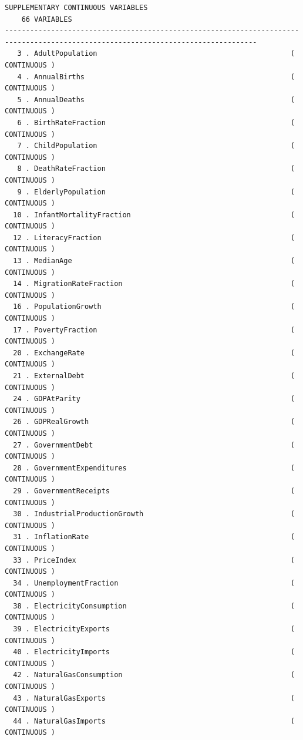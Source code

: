 \documentclass[a4paper,10pt,twocolumn]{article}
\begin{document}
\begin{landscape}
\begin{verbatim}
SUPPLEMENTARY CONTINUOUS VARIABLES
    66 VARIABLES
----------------------------------------------------------------------------------------------------------------------------------
   3 . AdultPopulation                                              ( CONTINUOUS )
   4 . AnnualBirths                                                 ( CONTINUOUS )
   5 . AnnualDeaths                                                 ( CONTINUOUS )
   6 . BirthRateFraction                                            ( CONTINUOUS )
   7 . ChildPopulation                                              ( CONTINUOUS )
   8 . DeathRateFraction                                            ( CONTINUOUS )
   9 . ElderlyPopulation                                            ( CONTINUOUS )
  10 . InfantMortalityFraction                                      ( CONTINUOUS )
  12 . LiteracyFraction                                             ( CONTINUOUS )
  13 . MedianAge                                                    ( CONTINUOUS )
  14 . MigrationRateFraction                                        ( CONTINUOUS )
  16 . PopulationGrowth                                             ( CONTINUOUS )
  17 . PovertyFraction                                              ( CONTINUOUS )
  20 . ExchangeRate                                                 ( CONTINUOUS )
  21 . ExternalDebt                                                 ( CONTINUOUS )
  24 . GDPAtParity                                                  ( CONTINUOUS )
  26 . GDPRealGrowth                                                ( CONTINUOUS )
  27 . GovernmentDebt                                               ( CONTINUOUS )
  28 . GovernmentExpenditures                                       ( CONTINUOUS )
  29 . GovernmentReceipts                                           ( CONTINUOUS )
  30 . IndustrialProductionGrowth                                   ( CONTINUOUS )
  31 . InflationRate                                                ( CONTINUOUS )
  33 . PriceIndex                                                   ( CONTINUOUS )
  34 . UnemploymentFraction                                         ( CONTINUOUS )
  38 . ElectricityConsumption                                       ( CONTINUOUS )
  39 . ElectricityExports                                           ( CONTINUOUS )
  40 . ElectricityImports                                           ( CONTINUOUS )
  42 . NaturalGasConsumption                                        ( CONTINUOUS )
  43 . NaturalGasExports                                            ( CONTINUOUS )
  44 . NaturalGasImports                                            ( CONTINUOUS )

\end{verbatim}
\end{landscape}
\end{document}
